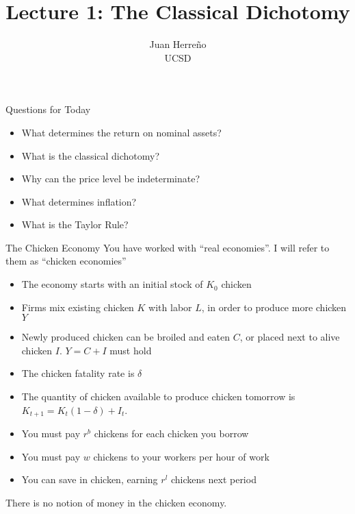 \documentclass[11pt,aspectratio=169,xcolor={dvipsnames},hyperref={pdftex,pdfpagemode=UseNone,hidelinks,pdfdisplaydoctitle=true},usepdftitle=false]{beamer}
\title{Lecture 1: The Classical Dichotomy}
\author{Juan Herre\~{n}o\\UCSD}
\begin{document}
\maketitle

\begin{frame}{Questions for Today}
\begin{itemize}
\item What determines the return on nominal assets?
\item What is the classical dichotomy?
\item Why can the price level be indeterminate?
\item What determines inflation?
\item What is the Taylor Rule?
\end{itemize}
\end{frame}



\begin{frame}{The Chicken Economy}
You have worked with 	``real economies''. I will refer to them as ``chicken economies''
\begin{itemize}
\item The economy starts with an initial stock of $K_0$ chicken 
\item Firms mix existing chicken $K$ with labor $L$, in order to produce more chicken $Y$
\item Newly produced chicken can be broiled and eaten $C$, or placed next to alive chicken $I$. $Y = C + I$ must hold
\item The chicken fatality rate is $\delta$
\item The quantity of chicken available to produce chicken tomorrow is $K_{t+1} = K_t (1-\delta) + I_t$.
\item You must pay $r^b$ chickens for each chicken you borrow
\item You must pay $w$ chickens to your workers per hour of work
\item You can save in chicken, earning $r^l$ chickens next period
\end{itemize}
There is no notion of money in the chicken economy.
\end{frame}
\end{document}
